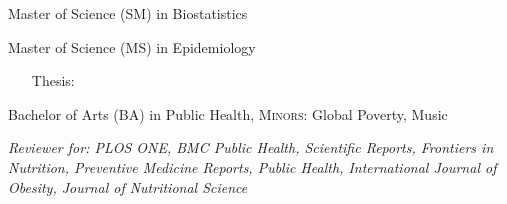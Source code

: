 \documentclass{cv_style}
\begin{document}
\parskip -4pt \noindent Master of Science (SM) in Biostatistics

\parskip -4pt Master of Science (MS) in Epidemiology \\
    \vspace{-1em}
    \begingroup
    \addtolength{\leftmargini}{3em} \begin{itemize}
        \item[\hspace{1em}Thesis:] 
    \end{itemize}
    \endgroup
\parskip -8pt  

\parskip -4pt \noindent  Bachelor of Arts (BA) in Public Health, \textsc{Minors:} Global Poverty, Music


\parskip -5pt 
\nocite{*}
\printbibliography[title=Publications]

\vspace{2em}

\textit{Reviewer for: PLOS ONE, BMC Public Health, Scientific Reports, Frontiers in Nutrition, Preventive Medicine Reports, Public Health, International Journal of Obesity, Journal of Nutritional Science}
\end{document}
